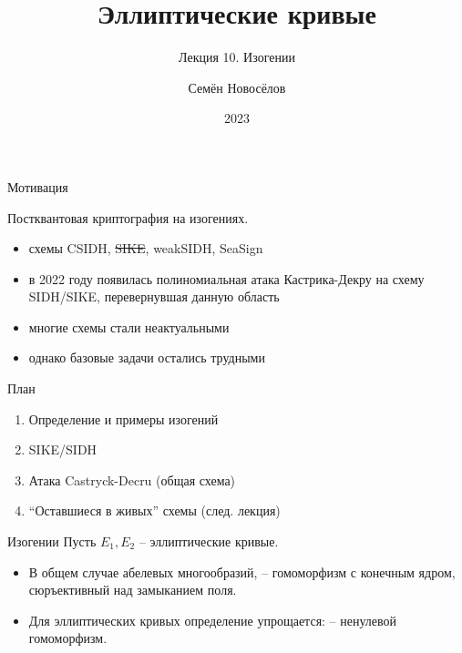 \documentclass{beamer}
\title{Эллиптические кривые}
\subtitle{Лекция 10. Изогении}
\author{Семён Новосёлов}
\institute{БФУ им. И. Канта}
\date{2023}
\begin{document}
\frame{\titlepage}

\newcommand{\UserA}{{\structure{{\Large\faUserSecret}}}}
\newcommand{\UserB}{{\structure{{\Large\faCat}}}}

\begin{frame}{Мотивация}
	
Постквантовая криптография на изогениях.
\vspace{0.5em}
	
\begin{itemize}
	\item схемы CSIDH, \sout{SIKE}, weakSIDH, SeaSign
	\item в 2022 году появилась полиномиальная атака Кастрика-Декру на схему SIDH/SIKE, перевернувшая данную область
	\item многие схемы стали неактуальными
	\item однако базовые задачи остались трудными
\end{itemize}
\end{frame}

\begin{frame}{План}
\begin{enumerate}
	\item Определение и примеры изогений
	\item SIKE/SIDH
	\item Атака Castryck-Decru (общая схема)
	\item ``Оставшиеся в живых'' схемы (след. лекция)
\end{enumerate}
\end{frame}

\begin{frame}{Изогении}
Пусть $E_1, E_2$ -- эллиптические кривые.

\begin{itemize}
    \item В общем случае абелевых многообразий,  -- гомоморфизм с конечным ядром, сюръективный над замыканием поля.
    \item Для эллиптических кривых определение упрощается:  -- ненулевой гомоморфизм.
\end{itemize}
\end{frame}
\end{document}
